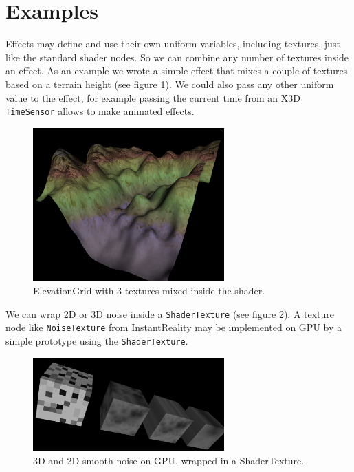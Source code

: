 \documentclass{egpubl}
\begin{document}
\section{Examples}

Effects may define and use their own uniform variables, including textures,
just like the standard shader nodes. So we can combine any number of textures
inside an effect. As an example we wrote a simple effect that mixes a couple of
textures based on a terrain height (see figure \ref{fig_terrain}).
We could also pass any other uniform value to the effect, for example
passing the current time from an X3D \texttt{TimeSensor} allows to make
animated effects.

\begin{figure}[H]
  \centering
  \includegraphics[width=2.9in]{terrain}
  \caption{ElevationGrid with 3 textures mixed inside the shader.}
  \label{fig_terrain}
\end{figure}

We can wrap 2D or 3D noise inside a \texttt{ShaderTexture}
(see figure \ref{fig_noise}).
A texture node like \texttt{NoiseTexture} from InstantReality
\cite{instant:noisetex}
may be implemented on GPU by a simple prototype using the \texttt{ShaderTexture}.

\begin{figure}[H]
  \centering
  \includegraphics[width=2.9in]{noise-cropped}
  \caption{3D and 2D smooth noise on GPU, wrapped in a ShaderTexture.}
  \label{fig_noise}
\end{figure}
\end{document}
